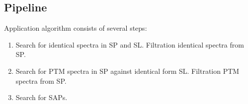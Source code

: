 \documentclass{article}
\begin{document}
\subsection{Pipeline}
\begin{figure}[H]
\end{figure}

Application algorithm consists of several steps:\\
\begin{enumerate}
\item{Search for identical spectra in SP and SL. Filtration identical spectra from SP.}
\item{Search for PTM spectra in SP against identical form SL. Filtration PTM spectra from SP.}
\item{Search for SAPs.}
\end{enumerate}
\clearpage
\end{document}
